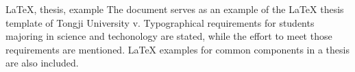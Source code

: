 

\begin{abstract}{LaTeX, 学位论文, 示例}
  本文是同济大学学位论文 LaTeX 模板 \version 版本的使用示例文档. 本文介绍了 2021 届理工学科本科生毕业设计 (论文) 的格式要求, 并大致介绍了模板为了满足格式要求所做的格式定制. 本文还针对常用的排版需求撰写了示例.
\end{abstract}

\begin{abstract*}{LaTeX, thesis, example}
  The document serves as an example of the LaTeX thesis template of Tongji University v\version . Typographical requirements for students majoring in science and techonology are stated, while the effort to meet those requirements are mentioned. LaTeX examples for common components in a thesis are also included.
\end{abstract*}
